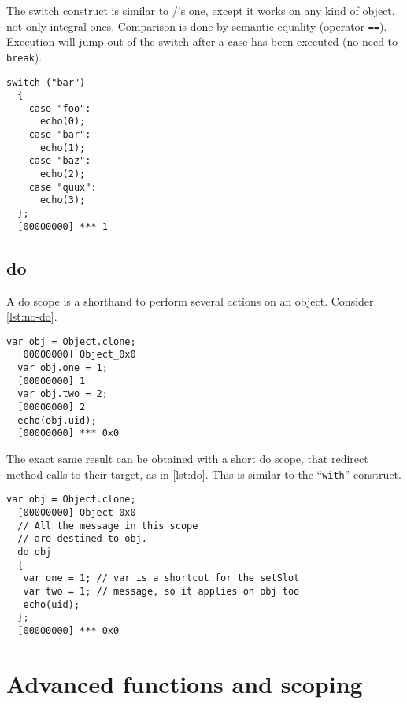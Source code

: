 \documentclass[openright,twoside,12pt]{report}
\begin{document}
The switch construct is similar to \C/\Cxx's one, except it works on
any kind of object, not only integral ones. Comparison is done by
semantic equality (operator \texttt{==}). Execution will jump out of
the switch after a case has been executed (no need to \texttt{break}).

\begin{lstlisting}[caption=The \texttt{switch} construct,
  label=switch]
  switch ("bar")
  {
    case "foo":
      echo(0);
    case "bar":
      echo(1);
    case "baz":
      echo(2);
    case "quux":
      echo(3);
  };
  [00000000] *** 1
\end{lstlisting}

\section{do}
\label{section:constructs/do}

A do scope is a shorthand to perform several actions on an
object. Consider \autoref{lst:no-do}.

\begin{lstlisting}[caption=Lot of code bloat,label=lst:no-do]
  var obj = Object.clone;
  [00000000] Object_0x0
  var obj.one = 1;
  [00000000] 1
  var obj.two = 2;
  [00000000] 2
  echo(obj.uid);
  [00000000] *** 0x0
\end{lstlisting}

The exact same result can be obtained with a short do scope, that
redirect method calls to their target, as in \autoref{lst:do}. This is similar
to the \pascal ``\texttt{with}'' construct.


\begin{lstlisting}[caption=Shorter with a do block,label=lst:do]
  var obj = Object.clone;
  [00000000] Object-0x0
  // All the message in this scope
  // are destined to obj.
  do obj
  {
   var one = 1; // var is a shortcut for the setSlot
   var two = 1; // message, so it applies on obj too
   echo(uid);
  };
  [00000000] *** 0x0
\end{lstlisting}



\chapter{Advanced functions and scoping}
\end{document}
